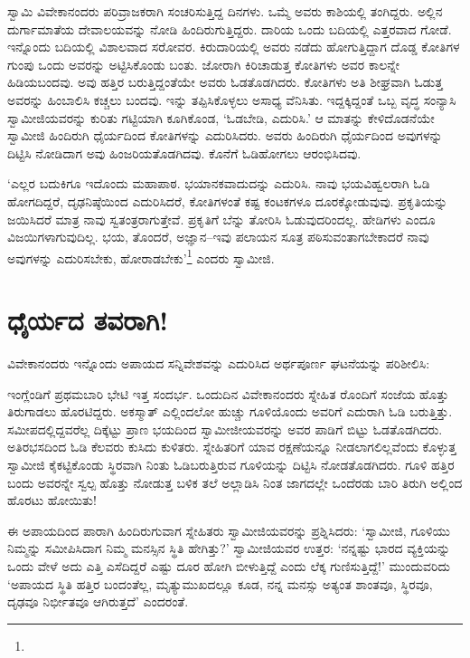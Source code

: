 ಸ್ವಾಮಿ ವಿವೇಕಾನಂದರು ಪರಿವ್ರಾಜಕರಾಗಿ ಸಂಚರಿಸುತ್ತಿದ್ದ ದಿನಗಳು. ಒಮ್ಮೆ ಅವರು ಕಾಶಿಯಲ್ಲಿ ತಂಗಿದ್ದರು. ಅಲ್ಲಿನ ದುರ್ಗಾಮಾತೆಯ ದೇವಾಲಯವನ್ನು ನೋಡಿ ಹಿಂದಿರುಗುತ್ತಿದ್ದರು. ದಾರಿಯ ಒಂದು ಬದಿಯಲ್ಲಿ ಎತ್ತರವಾದ ಗೋಡೆ. ಇನ್ನೊಂದು ಬದಿಯಲ್ಲಿ ವಿಶಾಲವಾದ ಸರೋವರ. ಕಿರುದಾರಿಯಲ್ಲಿ ಅವರು ನಡೆದು ಹೋಗುತ್ತಿದ್ದಾಗ ದೊಡ್ಡ ಕೋತಿಗಳ ಗುಂಪು ಒಂದು ಅವರನ್ನು ಅಟ್ಟಿಸಿಕೊಂಡು ಬಂತು. ಜೋರಾಗಿ ಕಿರಿಚಾಡುತ್ತ ಕೋತಿಗಳು ಅವರ ಕಾಲನ್ನೇ ಹಿಡಿಯಬಂದವು. ಅವು ಹತ್ತಿರ ಬರುತ್ತಿದ್ದಂತೆಯೇ ಅವರು ಓಡತೊಡಗಿದರು. ಕೋತಿಗಳು ಅತಿ ಶೀಘ್ರವಾಗಿ ಓಡುತ್ತ ಅವರನ್ನು ಹಿಂಬಾಲಿಸಿ ಕಚ್ಚಲು ಬಂದವು. ಇನ್ನು ತಪ್ಪಿಸಿಕೊಳ್ಳಲು ಅಸಾಧ್ಯ ವೆನಿಸಿತು. ಇದ್ದಕ್ಕಿದ್ದಂತೆ ಒಬ್ಬ ವೃದ್ಧ ಸಂನ್ಯಾಸಿ ಸ್ವಾಮೀಜಿಯವರನ್ನು ಕುರಿತು ಗಟ್ಟಿಯಾಗಿ ಕೂಗಿಕೊಂಡ, ‘ಓಡಬೇಡಿ, ಎದುರಿಸಿ.’ ಆ ಮಾತನ್ನು ಕೇಳಿದೊಡನೆಯೇ ಸ್ವಾಮೀಜಿ ಹಿಂದಿರುಗಿ ಧೈರ್ಯದಿಂದ ಕೋತಿಗಳನ್ನು ಎದುರಿಸಿದರು. ಅವರು ಹಿಂದಿರುಗಿ ಧೈರ್ಯದಿಂದ ಅವುಗಳನ್ನು ದಿಟ್ಟಿಸಿ ನೋಡಿದಾಗ ಅವು ಹಿಂಜರಿಯತೊಡಗಿದವು. ಕೊನೆಗೆ ಓಡಿಹೋಗಲು ಆರಂಭಿಸಿದವು.

‘ಎಲ್ಲರ ಬದುಕಿಗೂ ಇದೊಂದು ಮಹಾಪಾಠ. ಭಯಾನಕವಾದುದನ್ನು ಎದುರಿಸಿ. ನಾವು ಭಯವಿಹ್ವಲರಾಗಿ ಓಡಿ ಹೋಗದಿದ್ದರೆ, ದೃಢನಿಷ್ಠೆಯಿಂದ ಎದುರಿಸಿದರೆ, ಕೋತಿಗಳಂತೆ ಕಷ್ಟ ಕಂಟಕಗಳೂ ದೂರಕ್ಕೋಡುವುವು. ಪ್ರಕೃತಿಯನ್ನು ಜಯಿಸಿದರೆ ಮಾತ್ರ ನಾವು ಸ್ವತಂತ್ರರಾಗುತ್ತೇವೆ. ಪ್ರಕೃತಿಗೆ ಬೆನ್ನು ತೋರಿಸಿ ಓಡುವುದರಿಂದಲ್ಲ. ಹೇಡಿಗಳು ಎಂದೂ ವಿಜಯಿಗಳಾಗುವುದಿಲ್ಲ. ಭಯ, ತೊಂದರೆ, ಅಜ್ಞಾನ–ಇವು ಪಲಾಯನ ಸೂತ್ರ ಪಠಿಸುವಂತಾಗಬೇಕಾದರೆ ನಾವು ಅವುಗಳನ್ನು ಎದುರಿಸಬೇಕು, ಹೋರಾಡಬೇಕು’\footnote{\hfill{}} ಎಂದರು ಸ್ವಾಮೀಜಿ.


\section*{ಧೈರ್ಯದ ತವರಾಗಿ!}


ವಿವೇಕಾನಂದರು ಇನ್ನೊಂದು ಅಪಾಯದ ಸನ್ನಿವೇಶವನ್ನು ಎದುರಿಸಿದ ಅರ್ಥಪೂರ್ಣ ಘಟನೆಯನ್ನು ಪರಿಶೀಲಿಸಿ:

ಇಂಗ್ಲೆಂಡಿಗೆ ಪ್ರಥಮಬಾರಿ ಭೇಟಿ ಇತ್ತ ಸಂದರ್ಭ. ಒಂದುದಿನ ವಿವೇಕಾನಂದರು ಸ್ನೇಹಿತ ರೊಂದಿಗೆ ಸಂಜೆಯ ಹೊತ್ತು ತಿರುಗಾಡಲು ಹೊರಟಿದ್ದರು. ಅಕಸ್ಮಾತ್ ಎಲ್ಲಿಂದಲೋ ಹುಚ್ಚು ಗೂಳಿಯೊಂದು ಅವರಿಗೆ ಎದುರಾಗಿ ಓಡಿ ಬರುತ್ತಿತ್ತು. ಸಮೀಪದಲ್ಲಿದ್ದವರೆಲ್ಲ ದಿಕ್ಕೆಟ್ಟು ಪ್ರಾಣ ಭಯದಿಂದ ಸ್ವಾಮೀಜೀಯವರನ್ನು ಅವರ ಪಾಡಿಗೆ ಬಿಟ್ಟು ಓಡತೊಡಗಿದರು. ಅತಿರಭಸದಿಂದ ಓಡಿ ಕೆಲವರು ಕುಸಿದು ಕುಳಿತರು. ಸ್ನೇಹಿತರಿಗೆ ಯಾವ ರಕ್ಷಣೆಯನ್ನೂ ನೀಡಲಾಗಲಿಲ್ಲವೆಂದು ಕೊಳ್ಳುತ್ತ ಸ್ವಾಮೀಜಿ ಕೈಕಟ್ಟಿಕೊಂಡು ಸ್ಥಿರವಾಗಿ ನಿಂತು ಓಡಿಬರುತ್ತಿರುವ ಗೂಳಿಯನ್ನು ದಿಟ್ಟಿಸಿ ನೋಡತೊಡಗಿದರು. ಗೂಳಿ ಹತ್ತಿರ ಬಂದು ಅವರನ್ನೇ ಸ್ವಲ್ಪ ಹೊತ್ತು ನೋಡುತ್ತ ಬಳಿಕ ತಲೆ ಅಲ್ಲಾಡಿಸಿ ನಿಂತ ಜಾಗದಲ್ಲೇ ಒಂದೆರಡು ಬಾರಿ ತಿರುಗಿ ಅಲ್ಲಿಂದ ಹೊರಟು ಹೋಯಿತು!

ಈ ಅಪಾಯದಿಂದ ಪಾರಾಗಿ ಹಿಂದಿರುಗುವಾಗ ಸ್ನೇಹಿತರು ಸ್ವಾಮೀಜಿಯವರನ್ನು ಪ್ರಶ್ನಿಸಿದರು: ‘ಸ್ವಾಮೀಜಿ, ಗೂಳಿಯು ನಿಮ್ಮನ್ನು ಸಮೀಪಿಸಿದಾಗ ನಿಮ್ಮ ಮನಸ್ಸಿನ ಸ್ಥಿತಿ ಹೇಗಿತ್ತು?’ ಸ್ವಾಮೀಜಿಯವರ ಉತ್ತರ: ‘ನನ್ನಷ್ಟು ಭಾರದ ವ್ಯಕ್ತಿಯನ್ನು ಒಂದು ವೇಳೆ ಅದು ಎತ್ತಿ ಎಸೆದಿದ್ದರೆ ಎಷ್ಟು ದೂರ ಹೋಗಿ ಬೀಳುತ್ತಿದ್ದೆ ಎಂದು ಲೆಕ್ಕ ಗುಣಿಸುತ್ತಿದ್ದೆ!’ ಮುಂದುವರಿದು ‘ಅಪಾಯದ ಸ್ಥಿತಿ ಹತ್ತಿರ ಬಂದಂತೆಲ್ಲ, ಮೃತ್ಯುಮುಖದಲ್ಲೂ ಕೂಡ, ನನ್ನ ಮನಸ್ಸು ಅತ್ಯಂತ ಶಾಂತವೂ, ಸ್ಥಿರವೂ, ದೃಢವೂ ನಿರ್ಭೀತವೂ ಆಗಿರುತ್ತದೆ’ ಎಂದರಂತೆ.

